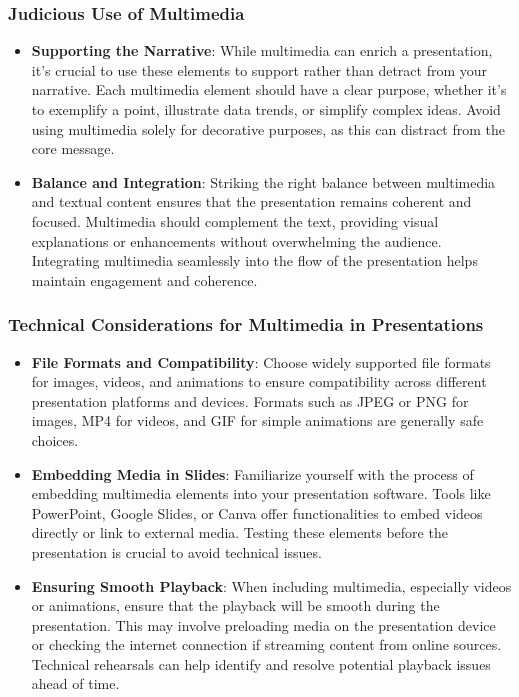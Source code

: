 \documentclass[
]{book}
\begin{document}
\hypertarget{judicious-use-of-multimedia}{%
\subsubsection*{Judicious Use of Multimedia}\label{judicious-use-of-multimedia}}

\begin{itemize}
\item
  \textbf{Supporting the Narrative}: While multimedia can enrich a presentation, it's crucial to use these elements to support rather than detract from your narrative. Each multimedia element should have a clear purpose, whether it's to exemplify a point, illustrate data trends, or simplify complex ideas. Avoid using multimedia solely for decorative purposes, as this can distract from the core message.
\item
  \textbf{Balance and Integration}: Striking the right balance between multimedia and textual content ensures that the presentation remains coherent and focused. Multimedia should complement the text, providing visual explanations or enhancements without overwhelming the audience. Integrating multimedia seamlessly into the flow of the presentation helps maintain engagement and coherence.
\end{itemize}

\hypertarget{technical-considerations-for-multimedia-in-presentations}{%
\subsubsection*{Technical Considerations for Multimedia in Presentations}\label{technical-considerations-for-multimedia-in-presentations}}

\begin{itemize}
\item
  \textbf{File Formats and Compatibility}: Choose widely supported file formats for images, videos, and animations to ensure compatibility across different presentation platforms and devices. Formats such as JPEG or PNG for images, MP4 for videos, and GIF for simple animations are generally safe choices.
\item
  \textbf{Embedding Media in Slides}: Familiarize yourself with the process of embedding multimedia elements into your presentation software. Tools like PowerPoint, Google Slides, or Canva offer functionalities to embed videos directly or link to external media. Testing these elements before the presentation is crucial to avoid technical issues.
\item
  \textbf{Ensuring Smooth Playback}: When including multimedia, especially videos or animations, ensure that the playback will be smooth during the presentation. This may involve preloading media on the presentation device or checking the internet connection if streaming content from online sources. Technical rehearsals can help identify and resolve potential playback issues ahead of time.
\end{itemize}
\end{document}
